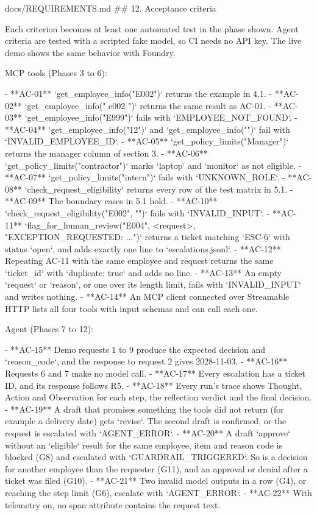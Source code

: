 \documentclass[11pt,letterpaper]{article}
\renewcommand{\_}{\textunderscore\allowbreak}
\begin{document}
\begin{appendixpromptbox}{docs/REQUIREMENTS.md}
## 12. Acceptance criteria

Each criterion becomes at least one automated test in the phase shown. Agent criteria are tested
with a scripted fake model, so CI needs no API key. The live demo shows the same behavior with
Foundry.

MCP tools (Phases 3 to 6):

- **AC-01** `get_employee_info("E002")` returns the example in 4.1.
- **AC-02** `get_employee_info(" e002 ")` returns the same result as AC-01.
- **AC-03** `get_employee_info("E999")` fails with `EMPLOYEE_NOT_FOUND`.
- **AC-04** `get_employee_info("12")` and `get_employee_info("")` fail with `INVALID_EMPLOYEE_ID`.
- **AC-05** `get_policy_limits("Manager")` returns the manager column of section 3.
- **AC-06** `get_policy_limits("contractor")` marks `laptop` and `monitor` as not eligible.
- **AC-07** `get_policy_limits("intern")` fails with `UNKNOWN_ROLE`.
- **AC-08** `check_request_eligibility` returns every row of the test matrix in 5.1.
- **AC-09** The boundary cases in 5.1 hold.
- **AC-10** `check_request_eligibility("E002", "")` fails with `INVALID_INPUT`.
- **AC-11** `flag_for_human_review("E004", <request>, "EXCEPTION_REQUESTED: ...")` returns a
  ticket matching `ESC-\d{6}` with status `open`, and adds exactly one line to
  `escalations.jsonl`.
- **AC-12** Repeating AC-11 with the same employee and request returns the same `ticket_id` with
  `duplicate: true` and adds no line.
- **AC-13** An empty `request` or `reason`, or one over its length limit, fails with
  `INVALID_INPUT` and writes nothing.
- **AC-14** An MCP client connected over Streamable HTTP lists all four tools with input schemas
  and can call each one.

Agent (Phases 7 to 12):

- **AC-15** Demo requests 1 to 9 produce the expected decision and `reason_code`, and the
  response to request 2 gives 2028-11-03.
- **AC-16** Requests 6 and 7 make no model call.
- **AC-17** Every escalation has a ticket ID, and its response follows R5.
- **AC-18** Every run's trace shows Thought, Action and Observation for each step, the
  reflection verdict and the final decision.
- **AC-19** A draft that promises something the tools did not return (for example a delivery
  date) gets `revise`. The second draft is confirmed, or the request is escalated with
  `AGENT_ERROR`.
- **AC-20** A draft `approve` without an `eligible` result for the same employee, item and reason
  code is blocked (G8) and escalated with `GUARDRAIL_TRIGGERED`. So is a decision for another
  employee than the requester (G11), and an approval or denial after a ticket was filed (G10).
- **AC-21** Two invalid model outputs in a row (G4), or reaching the step limit (G6), escalate
  with `AGENT_ERROR`.
- **AC-22** With telemetry on, no span attribute contains the request text.
\end{appendixpromptbox}
\end{document}
